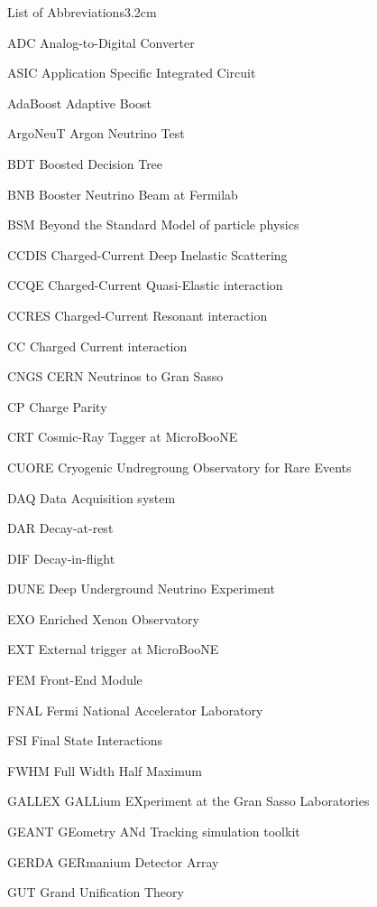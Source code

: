 \begin{mclistof}{List of Abbreviations}{3.2cm}

\item[ADC] Analog-to-Digital Converter
\item[ASIC] Application Specific Integrated Circuit
\item[AdaBoost] Adaptive Boost
\item[ArgoNeuT] Argon Neutrino Test
\item[BDT] Boosted Decision Tree
\item[BNB] Booster Neutrino Beam at Fermilab
\item[BSM] Beyond the Standard Model of particle physics
\item[CCDIS] Charged-Current Deep Inelastic Scattering
\item[CCQE] Charged-Current Quasi-Elastic interaction
\item[CCRES] Charged-Current Resonant interaction
\item[CC] Charged Current interaction
\item[CNGS] CERN Neutrinos to Gran Sasso
\item[CP] Charge Parity
\item[CRT] Cosmic-Ray Tagger at MicroBooNE
\item[CUORE] Cryogenic Undregroung Observatory for Rare Events
\item[DAQ] Data Acquisition system
\item[DAR] Decay-at-rest
\item[DIF] Decay-in-flight
\item[DUNE] Deep Underground Neutrino Experiment
\item[EXO] Enriched Xenon Observatory
\item[EXT] External trigger at MicroBooNE
\item[FEM] Front-End Module
\item[FNAL] Fermi National Accelerator Laboratory
\item[FSI] Final State Interactions
\item[FWHM] Full Width Half Maximum
\item[GALLEX] GALLium EXperiment at the Gran Sasso Laboratories
\item[GEANT] GEometry ANd Tracking simulation toolkit
\item[GERDA] GERmanium Detector Array
\item[GUT] Grand Unification Theory

\end{mclistof}
